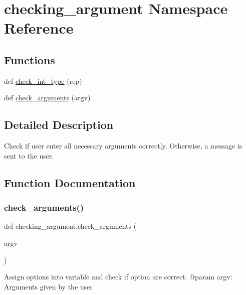 \hypertarget{namespacechecking__argument}{}\section{checking\+\_\+argument Namespace Reference}
\label{namespacechecking__argument}
\subsection*{Functions}
\begin{DoxyCompactItemize}
\item 
def \hyperlink{namespacechecking__argument_a3136d3e342a81821375edc2f731ce5f4}{check\+\_\+int\+\_\+type} (rep)
\item 
def \hyperlink{namespacechecking__argument_afe3bde94844d26f66c9a46cf08c4f1b3}{check\+\_\+arguments} (argv)
\end{DoxyCompactItemize}


\subsection{Detailed Description}
\begin{DoxyVerb}    Check if user enter all necessary arguments correctly.
    Otherwise, a message is sent to the user.
\end{DoxyVerb}
 

\subsection{Function Documentation}
\mbox{\label{namespacechecking__argument_afe3bde94844d26f66c9a46cf08c4f1b3}} 
\subsubsection{\texorpdfstring{check\+\_\+arguments()}{check\_arguments()}}
{\footnotesize\ttfamily def checking\+\_\+argument.\+check\+\_\+arguments (\begin{DoxyParamCaption}\item[{}]{argv }\end{DoxyParamCaption})}

\begin{DoxyVerb}Assign options into variable and check if
option are correct.
    @param argv: Arguments given by the user
\end{DoxyVerb}
 \mbox{\label{namespacechecking__argument_a3136d3e342a81821375edc2f731ce5f4}} 
